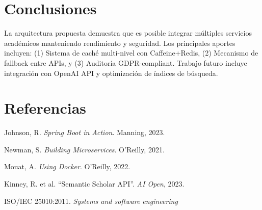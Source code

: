 \documentclass[10pt, journal]{IEEEtran}
\begin{document}
\section{Conclusiones}
La arquitectura propuesta demuestra que es posible integrar múltiples servicios académicos manteniendo rendimiento y seguridad. Los principales aportes incluyen: (1) Sistema de caché multi-nivel con Caffeine+Redis, (2) Mecanismo de fallback entre APIs, y (3) Auditoría GDPR-compliant. Trabajo futuro incluye integración con OpenAI API y optimización de índices de búsqueda.

\section*{Referencias}
\begin{thebibliography}{9}
Johnson, R. \emph{Spring Boot in Action}. Manning, 2023.

Newman, S. \emph{Building Microservices}. O'Reilly, 2021.

Mouat, A. \emph{Using Docker}. O'Reilly, 2022.

Kinney, R. et al. ``Semantic Scholar API''. \emph{AI Open}, 2023.

ISO/IEC 25010:2011. \emph{Systems and software engineering}
\end{thebibliography}
\end{document}
